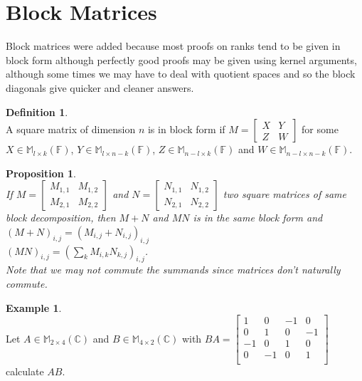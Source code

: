 \documentclass[12pt]{article}
\newtheorem{prop}[theorem]{Proposition}
\theoremstyle{definition}
\newtheorem{definition}[theorem]{Definition}
\newtheorem*{example}{Example}
\theoremstyle{remark}
\theoremstyle{plain}
\begin{document}
\newpage
\section{Block Matrices}
Block matrices were added because most proofs on ranks tend to be given in block form although perfectly good proofs may be given using kernel arguments, although some times we may have to deal with quotient spaces and so the block diagonals give quicker and cleaner answers.
\begin{definition}\leavevmode \\
    A square matrix of dimension $n$ is in block form if $M=\begin{bmatrix}
        X&Y\\
        Z&W
    \end{bmatrix}$
for some $X\in \mathbb{M}_{l\times k}(\mathbb{F})$, $Y\in \mathbb{M}_{l\times n-k}(\mathbb{F})$, $Z\in \mathbb{M}_{n-l\times k}(\mathbb{F})$ and $W\in \mathbb{M}_{n-l\times n-k}(\mathbb{F})$.
\end{definition}
\begin{prop}\leavevmode \\
    If $M=\begin{bmatrix}
        M_{1,1}&M_{1,2}\\
        M_{2,1}&M_{2,2}
    \end{bmatrix}$ and $N=\begin{bmatrix}
        N_{1,1}&N_{1,2}\\
        N_{2,1}&N_{2,2}
    \end{bmatrix}$ two square matrices of same block decomposition, then $M+N$ and $MN$ is in the same block form and\\
    $(M+N)_{i,j}=(M_{i,j}+N_{i,j})_{i,j}$
    \\$(MN)_{i,j}=(\sum\limits_kM_{i,k}N_{k,j})_{i,j}$.\\ Note that we may not commute the summands since matrices don't naturally commute.
\end{prop}
\begin{example}\leavevmode \\
    Let $A\in \mathbb{M}_{2 \times 4}(\mathbb{C})$ and $B\in \mathbb{M}_{4 \times 2}(\mathbb{C})$ with $BA=\begin{bmatrix}
        1 & 0 &-1 & 0\\
        0 & 1 & 0 & -1\\
        -1& 0 & 1 & 0 \\
        0 & -1 & 0 & 1\\
    \end{bmatrix}$ calculate $AB$.
\end{example}
\end{document}
